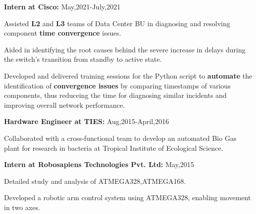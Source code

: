\documentclass[1pt]{article}
\begin{document}
\textbf{Intern at Cisco:} 
\hfill May,2021-July,2021
\begin{compactitem}
\item Assisted \textbf{L2} and \textbf{L3} teams of Data Center BU in diagnosing and resolving component \textbf{time convergence} issues.
\item Aided in identifying the root causes behind the severe increase in delays during the switch's transition from standby to active state.
\item Developed and delivered training sessions for the Python script to \textbf{automate} the identification of \textbf{convergence issues} by comparing timestamps of various components, thus  reduceing the time for diagnosing similar incidents and improving overall network performance.
\end{compactitem}

\textbf{ Hardware Engineer at TIES:}
\hfill Aug,2015-April,2016
\begin{compactitem}
\item Collaborated with a cross-functional team to develop an automated Bio Gas plant for research in bacteria at Tropical Institute of Ecological Science.
\end{compactitem}
\textbf{Intern at Robosapiens Technologies Pvt. Ltd:} 
\hfill May,2015
\begin{compactitem}
\item Detailed study and analysis of ATMEGA328,ATMEGA168. 
\item Developed a robotic arm control system using ATMEGA328, enabling movement in two axes.  
\end{compactitem}
\vspace{-6pt}
\end{document}
